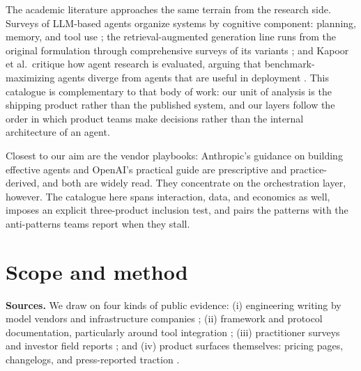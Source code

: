 \documentclass[11pt]{article}
\begin{document}
The academic literature approaches the same terrain from the research side.
Surveys of LLM-based agents organize systems by cognitive component: planning,
memory, and tool use \citep{wang2024agentsurvey}; the retrieval-augmented
generation line runs from the original formulation \citep{lewis2020rag}
through comprehensive surveys of its variants \citep{gao2023ragsurvey};
and Kapoor et al.\ critique how agent research is evaluated, arguing that
benchmark-maximizing agents diverge from agents that are useful in deployment
\citep{kapoor2024agentsmatter}. This catalogue is complementary to that body
of work: our unit of analysis is the shipping product rather than the
published system, and our layers follow the order in which product teams make
decisions rather than the internal architecture of an agent.

Closest to our aim are the vendor playbooks: Anthropic's guidance on building
effective agents \citep{anthropic2024agents} and OpenAI's practical guide
\citep{openai2025agentsguide} are prescriptive and practice-derived, and both
are widely read. They concentrate on the orchestration layer, however. The
catalogue here spans interaction, data, and economics as well, imposes an
explicit three-product inclusion test, and pairs the patterns with the
anti-patterns teams report when they stall.

\section{Scope and method}
\label{sec:method}

\textbf{Sources.} We draw on four kinds of public evidence: (i) engineering
writing by model vendors and infrastructure companies
\citep{anthropic2024agents, anthropic2025multiagent, openai2025agentsguide,
bornstein2023emerging, mlflow2026production, arize2026patterns}; (ii) framework and protocol
documentation, particularly around tool integration \citep{anthropic2024mcp};
(iii) practitioner surveys and investor field reports
\citep{langchain2024state, menlo2025enterprise, bvp2026pricing}; and (iv)
product surfaces themselves: pricing pages, changelogs, and press-reported
traction \citep{intercom2026fin, sierra2024outcomes, forbes2026cursor}.
\end{document}
